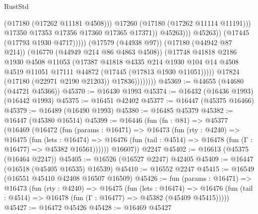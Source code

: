 \begin{lexlean}{RustStd}
\begin{coremodule}
                                              (@17180 (@17262 @11181 @4508)))
                                            @17260
                                            (@17180 (@17262 @11114 @11191)))
                                          @17350
                                          @17353
                                          @17356
                                          @17360
                                          @17365
                                          @17371))
                                      @45263)))
                                @45263))
                            (@17445 (@17793 @1930 @4717)))))
                      (@17579 (@44938 @97))
                      (@17180 (@44942 @87 @214))
                      (@16770 (@44949 @214 @86 @4863 @4508))
                      (@17748
                        @41818
                        @2186
                        @1930
                        @4508
                        @11053
                        (@17387
                          @41818
                          @4335
                          @214
                          @1930
                          @104
                          @14
                          @4508
                          @4519
                          @11051
                          @17111
                          @44872
                          (@17445 (@17813 @1930 @11051)))))
                    @17824
                    (@17180 (@22971 @2190 @21203))
                    @17836))))))))
@45369 := @44655 (@44680 (@44721 @45366))
@45370 := @16430 @1993
@45374 := @16432 (@16436 @1993) (@16442 @1993)
@45375 := @16451 @42402
@45377 := @16447 (@45375 @16466)
@45379 := @16489 (@16490 @1993)
@45380 := @16485 @45379
@45382 := @16447 (@45380 @16514)
@45399 := @16446
    (fun (fn : @81) =>
    @45377
      (@16469
        (@16472
          (fun (params : @16471) =>
          @16473
            (fun (rty : @4240) =>
            @16475
              (fun (lets : @16474) =>
              @16476 (fun (tail : @4514) => @16478 (fun (Γ : @16477) => @45382 @16561))))))
        @16607))
    @2247
@45402 := @16613 (@45375 (@16464 @2247))
@45405 := @16526 (@16527 @2247) @42405
@45409 := @16447 (@16518 (@45405 @16535) @16539)
@45410 := @16552 @2247
@45415 := @16549 (@16551 @45410 @42408 @16507 @16509)
@45426 := fun (params : @16471) =>
  @16473
    (fun (rty : @4240) =>
    @16475
      (fun (lets : @16474) =>
      @16476 (fun (tail : @4514) => @16478 (fun (Γ : @16477) => @45382 (@45409 @45415)))))
@45427 := @16472 @45426
@45428 := @16469 @45427

\end{coremodule}
\end{lexlean}
